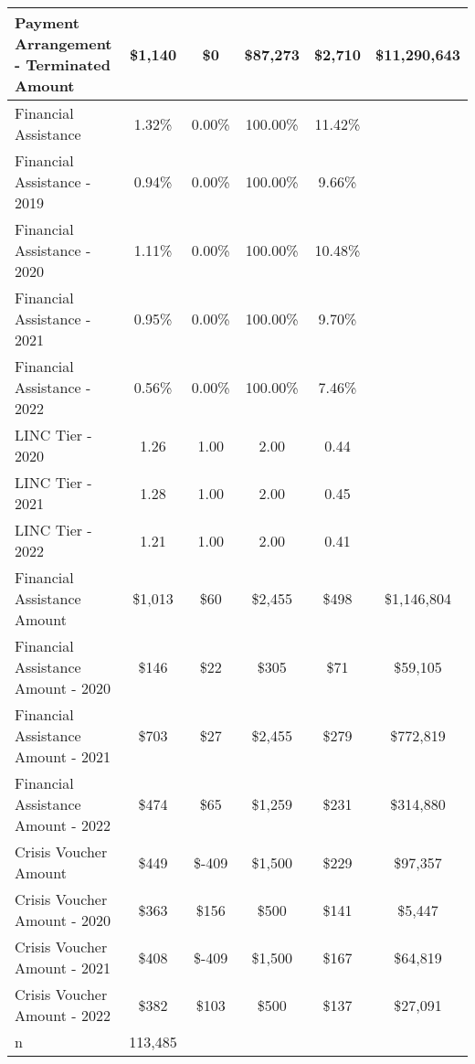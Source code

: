 \begin{tabular}{l|c|c|c|c|c}
\quad Payment Arrangement - Terminated Amount & \$1,140 & \$0 & \$87,273 & \$2,710 & \$11,290,643 \\
\midrule 
Financial Assistance & 1.32\% & 0.00\% & 100.00\% & 11.42\% \\
\quad Financial Assistance - 2019 & 0.94\% & 0.00\% & 100.00\% & 9.66\% \\
\quad Financial Assistance - 2020 & 1.11\% & 0.00\% & 100.00\% & 10.48\% \\
\quad Financial Assistance - 2021 & 0.95\% & 0.00\% & 100.00\% & 9.70\% \\
\quad Financial Assistance - 2022 & 0.56\% & 0.00\% & 100.00\% & 7.46\% \\
\midrule 
LINC Tier - 2020 & 1.26 & 1.00 & 2.00 & 0.44 \\
LINC Tier - 2021 & 1.28 & 1.00 & 2.00 & 0.45 \\
LINC Tier - 2022 & 1.21 & 1.00 & 2.00 & 0.41 \\
\midrule 
Financial Assistance Amount & \$1,013 & \$60 & \$2,455 & \$498 & \$1,146,804 \\
\quad Financial Assistance Amount - 2020 & \$146 & \$22 & \$305 & \$71 & \$59,105 \\
\quad Financial Assistance Amount - 2021 & \$703 & \$27 & \$2,455 & \$279 & \$772,819 \\
\quad Financial Assistance Amount - 2022 & \$474 & \$65 & \$1,259 & \$231 & \$314,880 \\
\midrule 
Crisis Voucher Amount & \$449 & \$-409 & \$1,500 & \$229 & \$97,357 \\
\quad Crisis Voucher Amount - 2020 & \$363 & \$156 & \$500 & \$141 & \$5,447 \\
\quad Crisis Voucher Amount - 2021 & \$408 & \$-409 & \$1,500 & \$167 & \$64,819 \\
\quad Crisis Voucher Amount - 2022 & \$382 & \$103 & \$500 & \$137 & \$27,091 \\
\midrule 
n & 113,485 &  &  &  &  \\
\midrule 
\bottomrule 
\end{tabular}
